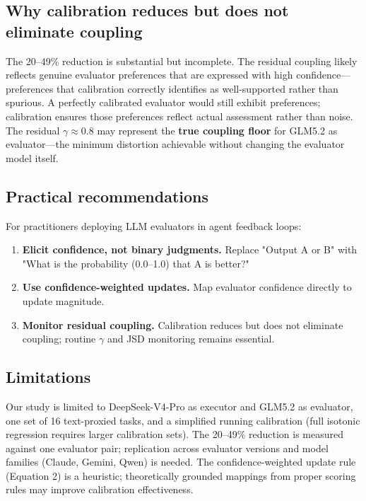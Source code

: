 \documentclass[11pt]{article}
\begin{document}
\subsection{Why calibration reduces but does not eliminate coupling}

The 20--49\% reduction is substantial but incomplete. The residual coupling likely reflects genuine evaluator preferences that are expressed with high confidence---preferences that calibration correctly identifies as well-supported rather than spurious. A perfectly calibrated evaluator would still exhibit preferences; calibration ensures those preferences reflect actual assessment rather than noise. The residual $\gamma \approx 0.8$ may represent the \textbf{true coupling floor} for GLM5.2 as evaluator---the minimum distortion achievable without changing the evaluator model itself.

\subsection{Practical recommendations}

For practitioners deploying LLM evaluators in agent feedback loops:
\begin{enumerate}[leftmargin=*,nosep]
 \item \textbf{Elicit confidence, not binary judgments.} Replace "Output A or B" with "What is the probability (0.0–1.0) that A is better?"
 \item \textbf{Use confidence-weighted updates.} Map evaluator confidence directly to update magnitude.
 \item \textbf{Monitor residual coupling.} Calibration reduces but does not eliminate coupling; routine $\gamma$ and JSD monitoring remains essential.
\end{enumerate}

\subsection{Limitations}

Our study is limited to DeepSeek-V4-Pro as executor and GLM5.2 as evaluator, one set of 16 text-proxied tasks, and a simplified running calibration (full isotonic regression requires larger calibration sets). The 20--49\% reduction is measured against one evaluator pair; replication across evaluator versions and model families (Claude, Gemini, Qwen) is needed. The confidence-weighted update rule (Equation 2) is a heuristic; theoretically grounded mappings from proper scoring rules may improve calibration effectiveness.
\end{document}
